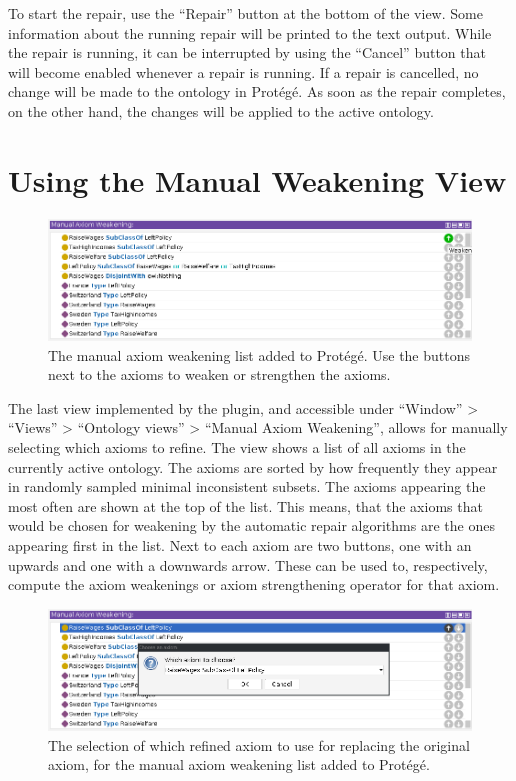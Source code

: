 To start the repair, use the ``Repair'' button at the bottom of the view. Some information about the running repair will be printed to the text output. While the repair is running, it can be interrupted by using the ``Cancel'' button that will become enabled whenever a repair is running. If a repair is cancelled, no change will be made to the ontology in Protégé. As soon as the repair completes, on the other hand, the changes will be applied to the active ontology.

\section{Using the Manual Weakening View}

\begin{figure}[htbp]
  \centering
  \includegraphics[width=\textwidth]{resources/protege-guide-list.png}
  \caption{The manual axiom weakening list added to Protégé. Use the buttons next to the axioms to weaken or strengthen the axioms.}
\end{figure}

The last view implemented by the plugin, and accessible under ``Window'' > ``Views'' > ``Ontology views'' > ``Manual Axiom Weakening'', allows for manually selecting which axioms to refine. The view shows a list of all axioms in the currently active ontology. The axioms are sorted by how frequently they appear in randomly sampled minimal inconsistent subsets. The axioms appearing the most often are shown at the top of the list. This means, that the axioms that would be chosen for weakening by the automatic repair algorithms are the ones appearing first in the list. Next to each axiom are two buttons, one with an upwards and one with a downwards arrow. These can be used to, respectively, compute the axiom weakenings or axiom strengthening operator for that axiom.

\begin{figure}[htbp]
  \centering
  \includegraphics[width=\textwidth]{resources/protege-guide-replace.png}
  \caption{The selection of which refined axiom to use for replacing the original axiom, for the manual axiom weakening list added to Protégé.}
\end{figure}

